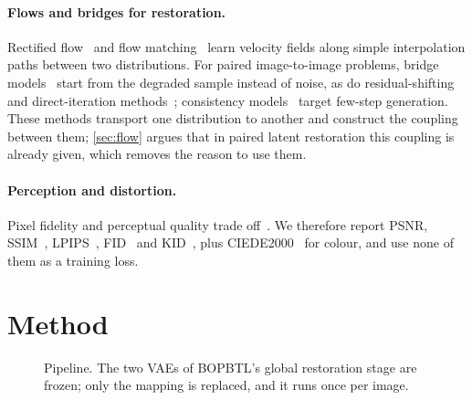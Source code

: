 \documentclass[10pt,twocolumn,letterpaper]{article}
\newcommand{\zA}{\bm{z}_A}
\newcommand{\hzB}{\hat{\bm{z}}_B}
\begin{document}
\paragraph{Flows and bridges for restoration.} Rectified flow~\cite{liu2023flow} and flow matching~\cite{lipman2023flow}
learn velocity fields along simple interpolation paths between two distributions. For paired image-to-image problems,
bridge models~\cite{liu2023i2sb,shi2023dsbm,albergo2023stochastic} start from the degraded sample instead of noise, as do
residual-shifting and direct-iteration methods~\cite{yue2023resshift,delbracio2023indi}; consistency
models~\cite{song2023consistency} target few-step generation. These methods transport one distribution to another and
construct the coupling between them; \cref{sec:flow} argues that in paired latent restoration this coupling is already
given, which removes the reason to use them.

\paragraph{Perception and distortion.} Pixel fidelity and perceptual quality trade off~\cite{blau2018perception}. We
therefore report PSNR, SSIM~\cite{wang2004ssim}, LPIPS~\cite{zhang2018lpips}, FID~\cite{heusel2017fid} and
KID~\cite{binkowski2018kid}, plus CIEDE2000~\cite{sharma2005ciede2000} for colour, and use none of them as a training loss.

\section{Method}
\label{sec:method}

\begin{figure}[t]
\centering
{}
\caption{Pipeline. The two VAEs of BOPBTL's global restoration stage are frozen; only the mapping is replaced, and it
runs once per image.}
\label{fig:pipeline}
\end{figure}
\end{document}
